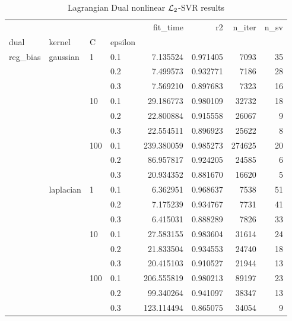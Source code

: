 \begin{table}[H]
\centering
\caption{Lagrangian Dual nonlinear $\protect \mathcal{L}_2$-SVR results}
\label{nonlinear_lagrangian_dual_l2_svr_cv_results}
\begin{tabular}{llllrrrr}
\toprule
           &           &     &     &    fit\_time &        r2 &  n\_iter &  n\_sv \\
dual & kernel & C & epsilon &             &           &         &       \\
\midrule
reg\_bias & gaussian & 1   & 0.1 &    7.135524 &  0.971405 &    7093 &    35 \\
           &           &     & 0.2 &    7.499573 &  0.932771 &    7186 &    28 \\
           &           &     & 0.3 &    7.569210 &  0.897683 &    7323 &    16 \\
           &           & 10  & 0.1 &   29.186773 &  0.980109 &   32732 &    18 \\
           &           &     & 0.2 &   22.800884 &  0.915558 &   26067 &     9 \\
           &           &     & 0.3 &   22.554511 &  0.896923 &   25622 &     8 \\
           &           & 100 & 0.1 &  239.380059 &  0.985273 &  274625 &    20 \\
           &           &     & 0.2 &   86.957817 &  0.924205 &   24585 &     6 \\
           &           &     & 0.3 &   20.934352 &  0.881670 &   16620 &     5 \\
           & laplacian & 1   & 0.1 &    6.362951 &  0.968637 &    7538 &    51 \\
           &           &     & 0.2 &    7.175239 &  0.934767 &    7731 &    41 \\
           &           &     & 0.3 &    6.415031 &  0.888289 &    7826 &    33 \\
           &           & 10  & 0.1 &   27.583155 &  0.983604 &   31614 &    24 \\
           &           &     & 0.2 &   21.833504 &  0.934553 &   24740 &    18 \\
           &           &     & 0.3 &   20.415103 &  0.910527 &   21944 &    13 \\
           &           & 100 & 0.1 &  206.555819 &  0.980213 &   89197 &    23 \\
           &           &     & 0.2 &   99.340264 &  0.941097 &   38347 &    13 \\
           &           &     & 0.3 &  123.114494 &  0.865075 &   34054 &     9 \\

\end{tabular}
\end{table}

